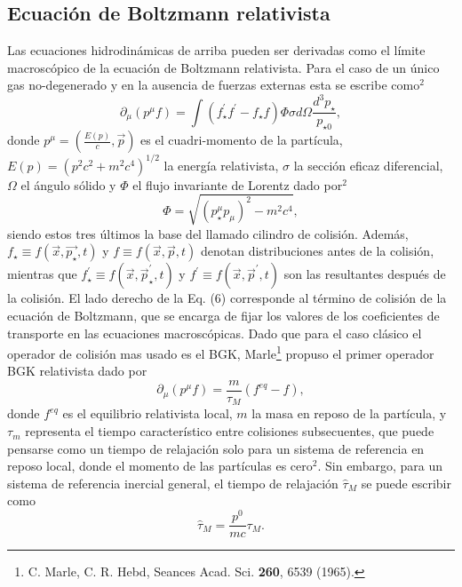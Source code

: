 \documentclass{article}
\begin{document}
\subsection{Ecuación de Boltzmann relativista}
Las ecuaciones hidrodinámicas de arriba pueden ser derivadas como el límite macroscópico de la ecuación de Boltzmann relativista. Para el caso de un único gas no-degenerado y en la ausencia de fuerzas externas esta se escribe como$^2$
\begin{equation}
    \partial_\mu (p^\mu f) = \int (f^{'}_\star f^{'} - f_\star f) \Phi \sigma d\Omega \frac{d^3 p_\star}{p_{\star 0}},
\end{equation}
donde $p^\mu = \left( \frac{E(p)}{c}, \vec{p} \right)$ es el cuadri-momento de la partícula, $E(p) = (p^2c^2 + m^2 c^4)^{1/2}$ la energía relativista, $\sigma$ la sección eficaz diferencial, $\Omega$ el ángulo sólido y $\Phi$ el flujo invariante de Lorentz dado por$^2$
\begin{equation}
    \Phi = \sqrt{(p^\mu_\star p_\mu)^2 - m^2c^4},
\end{equation}
siendo estos tres últimos la base del llamado cilindro de colisión. Además, $f_\star\equiv f(\vec{x}, \vec{p_\star}, t)$ y $f\equiv f(\vec{x}, \vec{p}, t)$ denotan distribuciones antes de la colisión, mientras que $f^{'}_\star\equiv f(\vec{x}, \vec{p}^{'}_\star, t)$ y $f^{'}\equiv f(\vec{x}, \vec{p}^{'}, t)$ son las resultantes después de la colisión. El lado derecho de la Eq. (6) corresponde al término de colisión de la ecuación de Boltzmann, que se encarga de fijar los valores de los coeficientes de transporte en las ecuaciones macroscópicas. Dado que para el caso clásico el operador de colisión mas usado es el BGK, Marle\footnote{C. Marle, C. R. Hebd, Seances Acad. Sci. \textbf{260}, 6539 (1965).} propuso el primer operador BGK relativista dado por
\begin{equation}
    \partial_\mu (p^\mu f) = \frac{m}{\tau_M} (f^{eq}-f),
\end{equation}
donde $f^{eq}$ es el equilibrio relativista local, $m$ la masa en reposo de la partícula, y $\tau_m$ representa el tiempo característico entre colisiones subsecuentes, que puede pensarse como un tiempo de relajación solo para un sistema de referencia en reposo local, donde el momento de las partículas es cero$^2$. Sin embargo, para un sistema de referencia inercial general, el tiempo de relajación $\hat{\tau}_M$ se puede escribir como
\begin{equation}
    \hat{\tau}_M = \frac{p^0}{mc} \tau_M.
\end{equation}
\end{document}
